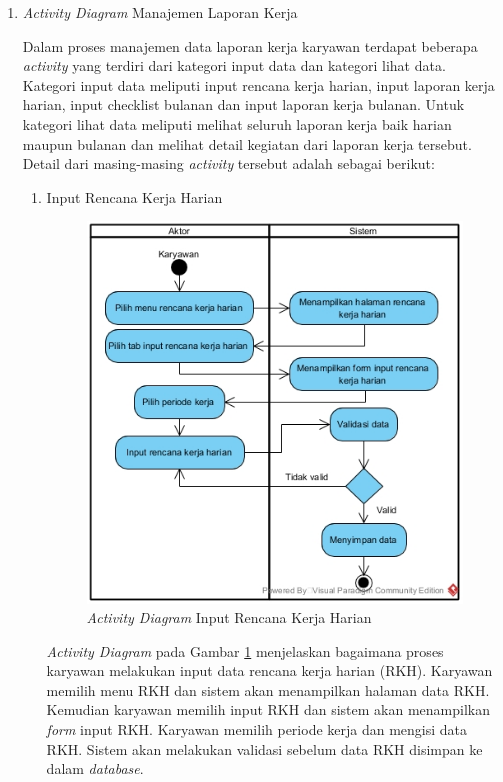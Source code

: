 \begin{enumerate}
            	\item \emph{Activity Diagram} Manajemen Laporan Kerja
            	
            	Dalam proses manajemen data laporan kerja karyawan terdapat beberapa \emph{activity} yang terdiri dari kategori input data dan kategori lihat data. Kategori input data meliputi input rencana kerja harian, input laporan kerja harian, input checklist bulanan dan input laporan kerja bulanan. Untuk kategori lihat data meliputi melihat seluruh laporan kerja baik harian maupun bulanan dan melihat detail kegiatan dari laporan kerja tersebut. Detail dari masing-masing \emph{activity} tersebut adalah sebagai berikut:\newpage
            		\begin{enumerate}[label=\alph*.]
            		    \itemsep0em
            		    \item Input Rencana Kerja Harian
            		    \begin{figure}[H]
                		    \centering                		    \includegraphics[width=11cm]{gambar/activity/input-rencana-kerja-harian}
                		    \caption{\emph{Activity Diagram} Input Rencana Kerja Harian}
                		    \label{activity_input_rkh}
                		\end{figure}
                		\emph{Activity Diagram} pada Gambar \ref{activity_input_rkh} menjelaskan bagaimana proses karyawan melakukan input data rencana kerja harian (RKH). Karyawan memilih menu RKH dan sistem akan menampilkan halaman data RKH. Kemudian karyawan memilih input RKH dan sistem akan menampilkan \emph{form} input RKH. Karyawan memilih periode kerja dan mengisi data RKH. Sistem akan melakukan validasi sebelum data RKH disimpan ke dalam \emph{database}.\newpage

\end{enumerate}
\end{enumerate}
